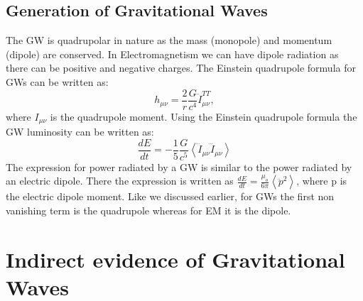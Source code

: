 \documentclass{ttuthes2007}
\begin{document}
\subsection{Generation of Gravitational Waves}
	The \ac{GW} is quadrupolar in nature as the mass (monopole) and
momentum (dipole) are conserved. In Electromagnetism we can have dipole
radiation as there can be positive and negative charges.
The Einstein quadrupole formula for \acp{GW} can be written as:
\begin{equation}\label{eg:strainamplitude}
h_{\mu\nu}= \frac{2}{r}\frac{G}{c^4}\ddot{I}_{\mu\nu}^{TT},
\end{equation}
where $I_{\mu\nu}$ is the quadrupole moment.
Using the Einstein quadrupole formula the \ac{GW} luminosity can be written
as:
\begin{equation}
\frac{dE}{dt} =
-\frac{1}{5}\frac{G}{c^5}\left\langle\dddot{I}_{\mu\nu}\dddot{I}_{\mu\nu}\right\rangle
\end{equation}
The expression for power radiated by a \ac{GW} is similar to the power radiated
by an electric dipole. There the expression is written as
$\frac{dE}{dt}=\frac{\mu_o}{6\pi}\left\langle \ddot{p}^2\right\rangle$, where p
is the electric dipole moment. Like we discussed earlier, for \acp{GW} the first
non vanishing term is the quadrupole whereas for \ac{EM} it is the dipole.

\section{Indirect evidence of Gravitational Waves}
	
\end{document}
